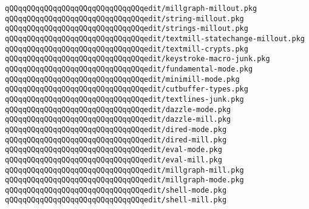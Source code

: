 \verb|qQQqqQQqqQQqqQQqqQQqqQQqqQQqqQQqedit/millgraph-millout.pkg|\newline
\verb|qQQqqQQqqQQqqQQqqQQqqQQqqQQqqQQqedit/string-millout.pkg|\newline
\verb|qQQqqQQqqQQqqQQqqQQqqQQqqQQqqQQqedit/strings-millout.pkg|\newline
\verb|qQQqqQQqqQQqqQQqqQQqqQQqqQQqqQQqedit/textmill-statechange-millout.pkg|\newline
\newline
\verb|qQQqqQQqqQQqqQQqqQQqqQQqqQQqqQQqedit/textmill-crypts.pkg|\newline
\newline
\newline
\newline
\verb|qQQqqQQqqQQqqQQqqQQqqQQqqQQqqQQqedit/keystroke-macro-junk.pkg|\newline
\verb|qQQqqQQqqQQqqQQqqQQqqQQqqQQqqQQqedit/fundamental-mode.pkg|\newline
\verb|qQQqqQQqqQQqqQQqqQQqqQQqqQQqqQQqedit/minimill-mode.pkg|\newline
\verb|qQQqqQQqqQQqqQQqqQQqqQQqqQQqqQQqedit/cutbuffer-types.pkg|\newline
\verb|qQQqqQQqqQQqqQQqqQQqqQQqqQQqqQQqedit/textlines-junk.pkg|\newline
\newline
\verb|qQQqqQQqqQQqqQQqqQQqqQQqqQQqqQQqedit/dazzle-mode.pkg|\newline
\verb|qQQqqQQqqQQqqQQqqQQqqQQqqQQqqQQqedit/dazzle-mill.pkg|\newline
\newline
\verb|qQQqqQQqqQQqqQQqqQQqqQQqqQQqqQQqedit/dired-mode.pkg|\newline
\verb|qQQqqQQqqQQqqQQqqQQqqQQqqQQqqQQqedit/dired-mill.pkg|\newline
\newline
\verb|qQQqqQQqqQQqqQQqqQQqqQQqqQQqqQQqedit/eval-mode.pkg|\newline
\verb|qQQqqQQqqQQqqQQqqQQqqQQqqQQqqQQqedit/eval-mill.pkg|\newline
\newline
\verb|qQQqqQQqqQQqqQQqqQQqqQQqqQQqqQQqedit/millgraph-mill.pkg|\newline
\verb|qQQqqQQqqQQqqQQqqQQqqQQqqQQqqQQqedit/millgraph-mode.pkg|\newline
\newline
\verb|qQQqqQQqqQQqqQQqqQQqqQQqqQQqqQQqedit/shell-mode.pkg|\newline
\verb|qQQqqQQqqQQqqQQqqQQqqQQqqQQqqQQqedit/shell-mill.pkg|\newline
